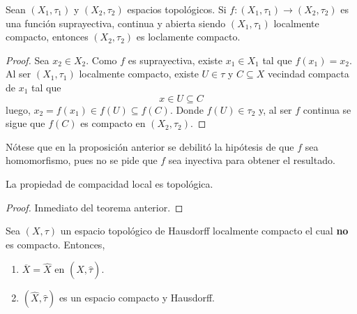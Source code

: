 \documentclass[12pt]{report}
\theoremstyle{largebreak}
\newcommand\cf[3]{\ensuremath{#1:#2\rightarrow#3}}
\newcommand{\Cls}[1]{\ensuremath{\overline{#1}}}
\begin{document}
    \begin{propo}
        Sean $(X_1,\tau_1)$ y $(X_2,\tau_2)$ espacios topológicos. Si $\cf{f}{(X_1,\tau_1)}{(X_2,\tau_2)}$ es una función suprayectiva, continua y abierta siendo $(X_1,\tau_1)$ localmente compacto, entonces $(X_2,\tau_2)$ es loclamente compacto.
    \end{propo}

    \begin{proof}
        Sea $x_2\in X_2$. Como $f$ es suprayectiva, existe $x_1\in X_1$ tal que $f(x_1)=x_2$. Al ser $(X_1,\tau_1)$ localmente compacto, existe $U\in\tau$ y $C\subseteq X$ vecindad compacta de $x_1$ tal que
        \begin{equation*}
            x\in U\subseteq C
        \end{equation*}
        luego,  $x_2=f(x_1)\in f(U)\subseteq f(C)$. Donde $f(U)\in\tau_2$ y, al ser $f$ continua se sigue que $f(C)$ es compacto en $(X_2,\tau_2)$.
    \end{proof}


    \begin{obs}
        Nótese que en la proposición anterior se debilitó la hipótesis de que $f$ sea homomorfismo, pues no se pide que $f$ sea inyectiva para obtener el resultado.
    \end{obs}

    \begin{cor}
        La propiedad de compacidad local es topológica.
    \end{cor}

    \begin{proof}
        Inmediato del teorema anterior.
    \end{proof}

    \begin{propo}
        Sea $(X,\tau)$ un espacio topológico de Hausdorff localmente compacto el cual \textbf{no} es compacto. Entonces,
        \begin{enumerate}
            \item $\Cls{X}=\hat{X}$ en $(\hat{X},\hat{\tau})$.
            \item $(\hat{X},\hat{\tau})$ es un espacio compacto y Hausdorff.
        \end{enumerate}  
    \end{propo}
\end{document}
